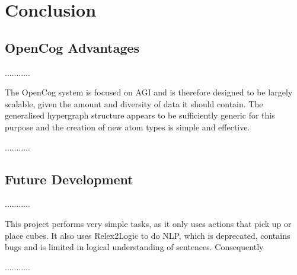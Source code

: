 \chapter{Conclusion} \label{cha:conclusion}


\section{OpenCog Advantages}\label{sec:opencog advantages}

...........

The OpenCog system is focused on AGI and is therefore designed to be largely scalable, given the amount and diversity of data it should contain. 
The generalised hypergraph structure appears to be sufficiently generic for this purpose and the creation of new atom types is simple and effective. 

...........

\section{Future Development}\label{sec:future_devel}

...........

This project performs very simple tasks, as it only uses actions that pick up or place cubes. 
It also uses Relex2Logic to do NLP, which is deprecated, contains bugs and is limited in logical understanding of sentences.
Consequently 

...........